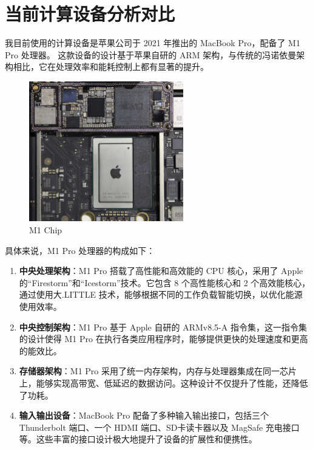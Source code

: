 \documentclass[12pt]{article} %
\theoremstyle{definition}
\begin{document}
\section{当前计算设备分析对比}

我目前使用的计算设备是苹果公司于 2021 年推出的 MacBook Pro\cite{MacBookPro2023}，配备了 M1 Pro 处理器。
这款设备的设计基于苹果自研的 ARM 架构，与传统的冯诺依曼架构相比，它在处理效率和能耗控制上都有显著的提升。

\begin{figure}[h]
  \centering
  \includegraphics[width=0.6\textwidth]{./figs/M1_A13_comparison_MacMini9_1_M1.jpg}
  \caption{M1 Chip\cite{Sonic84002020Image}}
  \label{fig:AppleM1}
\end{figure}

具体来说，M1 Pro 处理器\cite{AppleM12023}的构成如下：

\begin{enumerate}
  \item \textbf{中央处理架构}：M1 Pro 搭载了高性能和高效能的 CPU 核心，采用了 Apple 的“Firestorm”和“Icestorm”技术。它包含 8 个高性能核心和 2 个高效能核心\cite{GSMArenaAppleM1}，通过使用大.LITTLE 技术，能够根据不同的工作负载智能切换，以优化能源使用效率。
  \item \textbf{中央控制架构}：M1 Pro 基于 Apple 自研的 ARMv8.5-A 指令集，这一指令集的设计使得 M1 Pro 在执行各类应用程序时，能够提供更快的处理速度和更高的能效比。
  \item \textbf{存储器架构}：M1 Pro 采用了统一内存架构，内存与处理器集成在同一芯片上，能够实现高带宽、低延迟的数据访问。这种设计不仅提升了性能，还降低了功耗。
  \item \textbf{输入输出设备}：MacBook Pro 配备了多种输入输出接口，包括三个 Thunderbolt 端口、一个 HDMI 端口、SD卡读卡器以及 MagSafe 充电接口等。这些丰富的接口设计极大地提升了设备的扩展性和便携性。
\end{enumerate}
\end{document}
